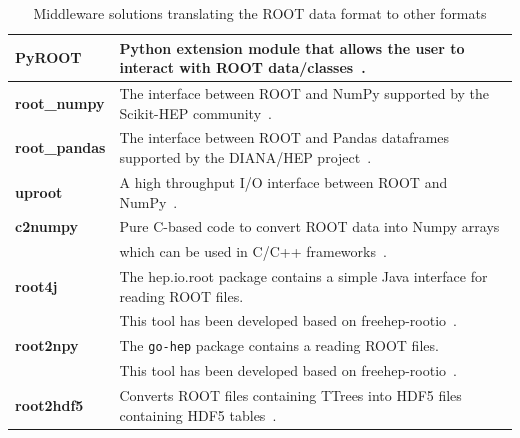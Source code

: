 \begin{table}%
 \caption{Middleware solutions translating the ROOT data format to other formats}
 \begin{center}
  \begin{tabular}{|l|l|}
   \hline
   {\bf PyROOT}       & Python extension module that allows the user to interact with ROOT data/classes~\cite{PyROOT}.          \\
   \hline
   {\bf root\_numpy}  & The interface between ROOT and NumPy supported by the Scikit-HEP community~\cite{root_numpy}.           \\
   \hline
   {\bf root\_pandas} & The interface between ROOT and Pandas dataframes supported by the DIANA/HEP project~\cite{root_pandas}. \\
   \hline
   {\bf uproot}       & A high throughput I/O interface between ROOT and NumPy~\cite{uproot}.                                   \\
   \hline
   {\bf c2numpy}      & Pure C-based code to convert ROOT data into Numpy arrays                                                \\
                      & which can be used in C/C++ frameworks~\cite{c2numpy}.                                                   \\
   \hline

   {\bf root4j}       & The hep.io.root package contains a simple Java interface for reading ROOT files.                        \\
                      & This tool has been developed based on freehep-rootio~\cite{root4j}.                                     \\
   \hline

   {\bf root2npy}     & The \texttt{go-hep} package contains a reading ROOT files.                                              \\
                      & This tool has been developed based on freehep-rootio~\cite{root4j}.                                     \\
   \hline

   {\bf root2hdf5}    & Converts ROOT files containing TTrees into HDF5 files containing HDF5 tables~\cite{root2hdf5}.          \\
   \hline
  \end{tabular}
 \end{center}
 \label{table:Middleware}
\end{table}



